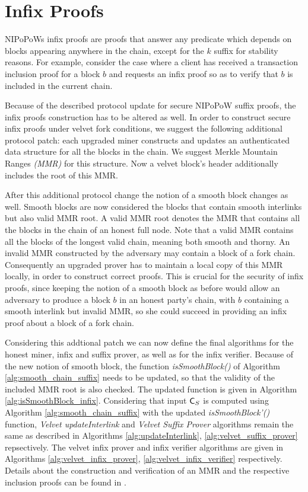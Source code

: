 \section{Infix Proofs}\label{sec:infix}
NIPoPoWs infix proofs are proofs that answer any predicate which depends on blocks appearing anywhere in the chain, except for the $k$ suffix for stability reasons. For example, consider the case where a client has received a transaction inclusion proof for a block $b$ and requests an infix proof so as to verify that $b$ is included in the current chain.

Because of the described protocol update for secure NIPoPoW suffix proofs, the infix proofs construction has to be altered as well. In order to construct secure infix proofs under velvet fork conditions, we suggest the following additional protocol patch: each upgraded miner constructs and updates an authenticated data structure for all the blocks in the chain. We suggest Merkle Mountain Ranges \emph{(MMR)} for this structure. Now a velvet block's header additionally includes the root of this MMR.

After this additional protocol change the notion of a smooth block changes as well. Smooth blocks are now considered the blocks that contain smooth interlinks but also valid MMR root. A valid MMR root denotes the MMR that contains all the blocks in the chain of an honest full node. Note that a valid MMR contains all the blocks of the longest valid chain, meaning both smooth and thorny. An invalid MMR constructed by the adversary may contain a block of a fork chain. Consequently an upgraded prover has to maintain a local copy of this MMR locally, in order to construct correct proofs. This is crucial for the security of infix proofs, since keeping the notion of a smooth block as before would allow an adversary to produce a block $b$ in an honest party's chain, with $b$ containing a smooth interlink but invalid MMR, so she could succeed in providing an infix proof about a block of a fork chain.

Considering this addtional patch we can now define the final algorithms for the honest miner, infix and suffix prover, as well as for the infix verifier. Because of the new notion of smooth block, the function \textit{isSmoothBlock()} of Algorithm \ref{alg:smooth_chain_suffix} needs to be updated, so that the validity of the included MMR root is also checked. The updated function is given in Algorithm \ref{alg:isSmoothBlock_infix}. Considering that input $\mathsf{C}_S$ is computed using Algorithm \ref{alg:smooth_chain_suffix} with the updated \textit{isSmoothBlock'()} function, \emph{Velvet updateInterlink} and \emph{Velvet Suffix Prover} algorithms remain the same as described in Algorithms \ref{alg:updateInterlink}, \ref{alg:velvet_suffix_prover} repsectively. The velvet infix prover and infix verifier algorithms are given in Algorithms \ref{alg:velvet_infix_prover}, \ref{alg:velvet_infix_verifier} respectively. Details about the construction and verification of an MMR and the respective inclusion proofs can be found in \cite{ct}.

